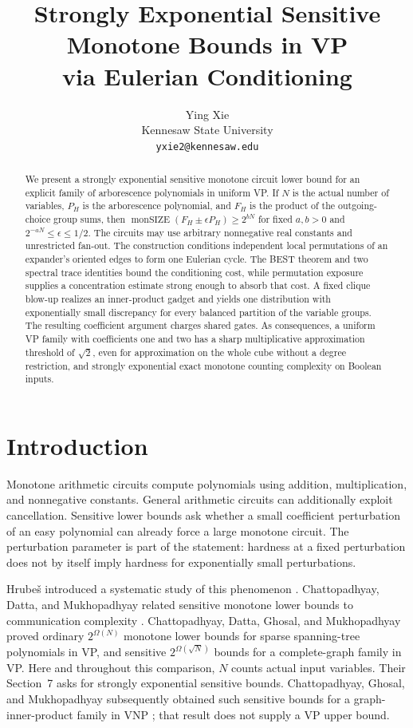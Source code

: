 \documentclass[11pt]{article}
\title{Strongly Exponential Sensitive Monotone Bounds in VP\\
via Eulerian Conditioning}
\author{Ying Xie\\Kennesaw State University\\
\texttt{yxie2@kennesaw.edu}}
\date{}
\theoremstyle{definition}
\theoremstyle{remark}
\numberwithin{equation}{section}
\begin{document}
\maketitle
\begin{abstract}
We present a strongly exponential sensitive monotone circuit lower bound
for an explicit family of arborescence polynomials in uniform VP.
If \(N\) is the actual number of variables, \(P_H\) is the arborescence
polynomial, and \(F_H\) is the product of the outgoing-choice group sums,
then \(\operatorname{monSIZE}(F_H\pm\epsilon P_H)\ge 2^{bN}\)
for fixed \(a,b>0\) and \(2^{-aN}\le\epsilon\le1/2\).
The circuits may use arbitrary nonnegative real constants and unrestricted
fan-out. The construction conditions independent local permutations of
an expander's oriented edges to form one Eulerian cycle.
The BEST theorem and two spectral trace identities bound the conditioning
cost, while permutation exposure supplies a concentration estimate strong
enough to absorb that cost. A fixed clique blow-up realizes an
inner-product gadget and yields one distribution with exponentially small
discrepancy for every balanced partition of the variable groups.
The resulting coefficient argument charges shared gates.
As consequences, a uniform VP family with coefficients one and two has a
sharp multiplicative approximation threshold of \(\sqrt2\), even for
approximation on the whole cube without a degree restriction, and
strongly exponential exact monotone counting complexity on Boolean inputs.
\end{abstract}

\section{Introduction}\label{sec:intro}

Monotone arithmetic circuits compute polynomials using addition,
multiplication, and nonnegative constants. General arithmetic circuits
can additionally exploit cancellation. Sensitive lower bounds ask whether
a small coefficient perturbation of an easy polynomial can already force
a large monotone circuit. The perturbation parameter is part of the
statement: hardness at a fixed perturbation does not by itself imply
hardness for exponentially small perturbations.

Hrube\v{s} introduced a systematic study of this phenomenon
\cite{Hrubes2020}. Chattopadhyay, Datta, and Mukhopadhyay related
sensitive monotone lower bounds to communication complexity
\cite{CDM2021}. Chattopadhyay, Datta, Ghosal, and Mukhopadhyay
\cite{CDGM2022} proved ordinary \(2^{\Omega(N)}\) monotone lower bounds
for sparse spanning-tree polynomials in VP, and sensitive
\(2^{\Omega(\sqrt N)}\) bounds for a complete-graph family in VP.
Here and throughout this comparison, \(N\) counts actual input variables.
Their Section~7 asks for strongly exponential sensitive bounds.
Chattopadhyay, Ghosal, and Mukhopadhyay subsequently obtained such
sensitive bounds for a graph-inner-product family in VNP
\cite{CGM2022}; that result does not supply a VP upper bound.
\end{document}
